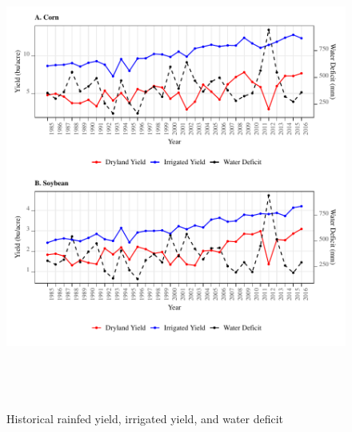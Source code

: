 \documentclass[
]{article}
\begin{document}
\begin{figure}[H]

{\centering \includegraphics[width=750px,height=6in,]{../../Figures/g_y_wd_all} 

}

\caption{Historical rainfed yield, irrigated yield, and water deficit}\label{fig:deficit-yield-hist}
\end{figure}
\end{document}
